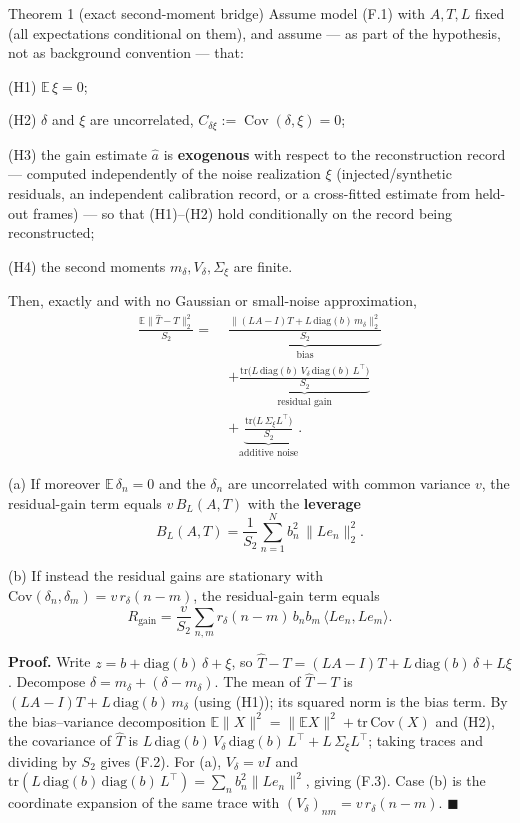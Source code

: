 \begin{namedthm}{Theorem 1 (exact second-moment bridge)}
Assume model (F.1) with $A,T,L$ fixed (all expectations conditional on them), and assume --- as part of the hypothesis, not as background convention --- that:

(H1) $\mathbb{E}\,\xi=0$;

(H2) $\delta$ and $\xi$ are uncorrelated, $C_{\delta\xi}:=\operatorname{Cov}(\delta,\xi)=0$;

(H3) the gain estimate $\hat a$ is \textbf{exogenous} with respect to the reconstruction record --- computed independently of the noise realization $\xi$ (injected/synthetic residuals, an independent calibration record, or a cross-fitted estimate from held-out frames) --- so that (H1)--(H2) hold conditionally on the record being reconstructed;

(H4) the second moments $m_\delta,V_\delta,\Sigma_\xi$ are finite.

Then, exactly and with no Gaussian or small-noise approximation,
\begin{align*}
\frac{\mathbb{E}\|\hat T-T\|_2^2}{S_2}
=\;&\underbrace{\frac{\|(LA-I)T+L\,\mathrm{diag}(b)\,m_\delta\|_2^2}{S_2}}_{\text{bias}}\\
&+\underbrace{\frac{\mathrm{tr}\!\big(L\,\mathrm{diag}(b)\,V_\delta\,\mathrm{diag}(b)\,L^\top\big)}{S_2}}_{\text{residual gain}}\\
&+\underbrace{\frac{\mathrm{tr}\!\big(L\,\Sigma_\xi L^\top\big)}{S_2}}_{\text{additive noise}}. \tag{F.2}
\end{align*}

(a) If moreover $\mathbb{E}\,\delta_n=0$ and the $\delta_n$ are uncorrelated with common variance $v$, the residual-gain term equals $v\,B_L(A,T)$ with the \textbf{leverage}
\begin{equation}
B_L(A,T)=\frac{1}{S_2}\sum_{n=1}^N b_n^2\,\|Le_n\|_2^2. \tag{F.3}
\end{equation}

(b) If instead the residual gains are stationary with $\mathrm{Cov}(\delta_n,\delta_m)=v\,r_\delta(n-m)$, the residual-gain term equals
\begin{equation}
R_{\mathrm{gain}}=\frac{v}{S_2}\sum_{n,m} r_\delta(n-m)\,b_n b_m\,\langle Le_n,Le_m\rangle. \tag{F.4}
\end{equation}
\end{namedthm}

\noindent\textbf{Proof.} Write $z=b+\mathrm{diag}(b)\,\delta+\xi$, so $\hat T-T=(LA-I)T+L\,\mathrm{diag}(b)\,\delta+L\xi$. Decompose $\delta=m_\delta+(\delta-m_\delta)$. The mean of $\hat T-T$ is $(LA-I)T+L\,\mathrm{diag}(b)\,m_\delta$ (using (H1)); its squared norm is the bias term. By the bias--variance decomposition $\mathbb{E}\|X\|^2=\|\mathbb{E}X\|^2+\mathrm{tr}\,\mathrm{Cov}(X)$ and (H2), the covariance of $\hat T$ is $L\,\mathrm{diag}(b)\,V_\delta\,\mathrm{diag}(b)\,L^\top+L\,\Sigma_\xi L^\top$; taking traces and dividing by $S_2$ gives (F.2). For (a), $V_\delta=vI$ and $\mathrm{tr}(L\,\mathrm{diag}(b)\,\mathrm{diag}(b)\,L^\top)=\sum_n b_n^2\|Le_n\|^2$, giving (F.3). Case (b) is the coordinate expansion of the same trace with $(V_\delta)_{nm}=v\,r_\delta(n-m)$. \hfill$\blacksquare$

